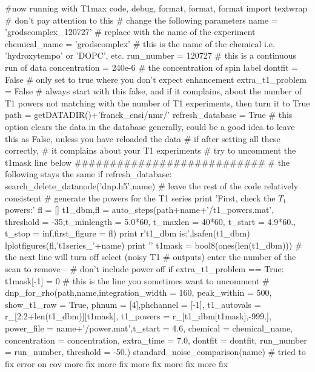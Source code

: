 \begin{scriptsize}
\begin{python}[off]
#now running with T1max code, debug, format, format, format
import textwrap # don't pay attention to this
# change the following parameters
name = 'grodscomplex_120727' # replace with the name of the experiment
chemical_name = 'grodscomplex' # this is the name of the chemical i.e. 'hydroxytempo' or 'DOPC', etc.
run_number = 120727 # this is a continuous run of data
concentration = 240e-6 # the concentration of spin label
dontfit = False # only set to true where you don't expect enhancement
extra_t1_problem = False # always start with this false, and if it complains, about the number of T1 powers not matching with the number of T1 experiments, then turn it to True
path = getDATADIR()+'franck_cnsi/nmr/'
refresh_database = True # this option clears the data in the database generally, could be a good idea to leave this as False, unless you have reloaded the data
# if after setting all these correctly,
# it complains about your T1 experiments
# try to uncomment the t1mask line below
###########################
# the following stays the same
if refresh_database:
    search_delete_datanode('dnp.h5',name)
# leave the rest of the code relatively consistent
#{{{ generate the powers for the T1 series
print 'First, check the $T_1$ powers:\n\n'
fl = []
t1_dbm,fl = auto_steps(path+name+'/t1_powers.mat',
    threshold = -35,t_minlength = 5.0*60,
    t_maxlen = 40*60, t_start = 4.9*60.,
    t_stop = inf,first_figure = fl)
print r't1\_dbm is:',lsafen(t1_dbm)
lplotfigures(fl,'t1series_'+name)
print '\n\n'
t1mask = bool8(ones(len(t1_dbm)))
# the next line will turn off select (noisy T1
# outputs) enter the number of the scan to remove --
# don't include power off
if extra_t1_problem == True:
    t1mask[-1] = 0 # this is the line you sometimes want to uncomment
#}}}
dnp_for_rho(path,name,integration_width = 160,
        peak_within = 500, show_t1_raw = True,
        phnum = [4],phchannel = [-1],
        t1_autovals = r_[2:2+len(t1_dbm)][t1mask],
        t1_powers = r_[t1_dbm[t1mask],-999.],
        power_file = name+'/power.mat',t_start = 4.6,
        chemical = chemical_name,
        concentration = concentration,
        extra_time = 7.0,
        dontfit = dontfit,
        run_number = run_number,
        threshold = -50.)
standard_noise_comparison(name)
# tried to fix error on cov more fix more fix more fix more fix more fix
\end{python}
\end{scriptsize}

